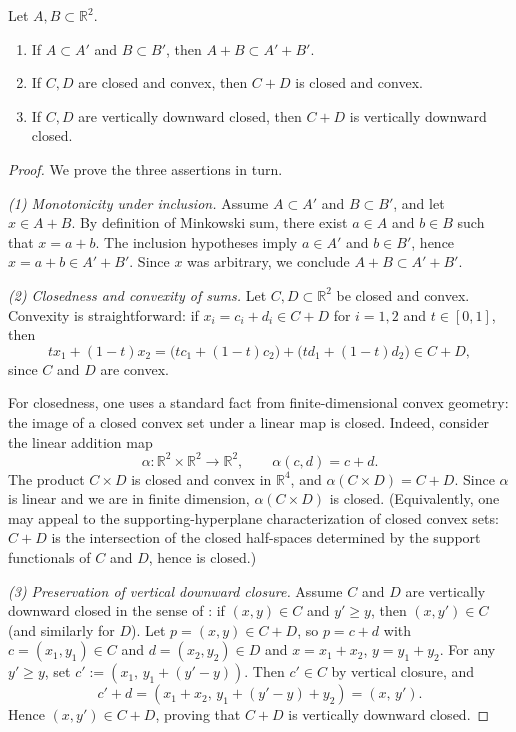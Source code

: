 \begin{lemma}
  \label{lem:lch_minkowski_basic}
  
  \leanok
  
  
  Let $A,B\subset\mathbb{R}^2$.
  \begin{enumerate}
    \item If $A\subset A'$ and $B\subset B'$, then $A+B\subset A'+B'$.
    \item If $C,D$ are closed and convex, then $C+D$ is closed and convex.
    \item If $C,D$ are vertically downward closed, then $C+D$ is vertically downward closed.
  \end{enumerate}
\end{lemma}

\begin{proof}
 
  We prove the three assertions in turn.

  \emph{(1) Monotonicity under inclusion.}
  Assume $A\subset A'$ and $B\subset B'$, and let $x\in A+B$.
  By definition of Minkowski sum, there exist $a\in A$ and $b\in B$ such that $x=a+b$.
  The inclusion hypotheses imply $a\in A'$ and $b\in B'$, hence $x=a+b\in A'+B'$.
  Since $x$ was arbitrary, we conclude $A+B\subset A'+B'$.

  \emph{(2) Closedness and convexity of sums.}
  Let $C,D\subset\mathbb{R}^2$ be closed and convex.
  Convexity is straightforward: if $x_i=c_i+d_i\in C+D$ for $i=1,2$ and $t\in[0,1]$, then
  \[
    t x_1+(1-t)x_2 = \big(t c_1+(1-t)c_2\big) + \big(t d_1+(1-t)d_2\big)\in C+D,
  \]
  since $C$ and $D$ are convex.

  For closedness, one uses a standard fact from finite-dimensional convex geometry:
  the image of a closed convex set under a linear map is closed.
  Indeed, consider the linear addition map
  \[
    \alpha : \mathbb{R}^2\times\mathbb{R}^2 \to \mathbb{R}^2,\qquad \alpha(c,d)=c+d.
  \]
  The product $C\times D$ is closed and convex in $\mathbb{R}^4$, and $\alpha(C\times D)=C+D$.
  Since $\alpha$ is linear and we are in finite dimension, $\alpha(C\times D)$ is closed.
  (Equivalently, one may appeal to the supporting-hyperplane characterization of closed convex sets:
  $C+D$ is the intersection of the closed half-spaces determined by the support functionals of $C$ and $D$,
  hence is closed.)

  \emph{(3) Preservation of vertical downward closure.}
  Assume $C$ and $D$ are vertically downward closed in the sense of :
  if $(x,y)\in C$ and $y'\ge y$, then $(x,y')\in C$ (and similarly for $D$).
  Let $p=(x,y)\in C+D$, so $p=c+d$ with $c=(x_1,y_1)\in C$ and $d=(x_2,y_2)\in D$ and $x=x_1+x_2$, $y=y_1+y_2$.
  For any $y'\ge y$, set $c':=(x_1,\,y_1+(y'-y))$.
  Then $c'\in C$ by vertical closure, and
  \[
    c' + d = (x_1+x_2,\,y_1+(y'-y)+y_2) = (x,\,y').
  \]
  Hence $(x,y')\in C+D$, proving that $C+D$ is vertically downward closed.
\end{proof}


